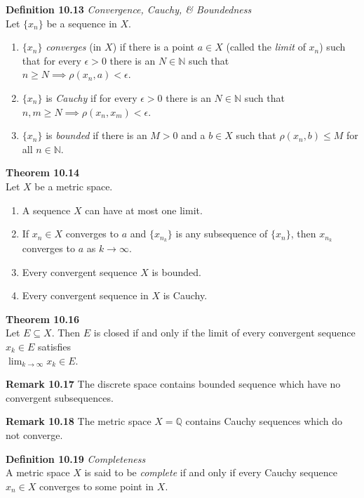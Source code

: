 \documentclass[8pt,landscape]{article}
\begin{document}
\begin{multicols}{3}
\textbf{Definition 10.13} \emph{Convergence, Cauchy, \& Boundedness} \\
Let $\{x_n\}$ be a sequence in $X$.
\begin{enumerate}
    \item $\{x_n\}$ \emph{converges} (in $X$) if there is a point $a \in X$
        (called the \emph{limit} of $x_n$) such that for every $\epsilon > 0$
        there is an $N \in \mathbb{N}$ such that \\
        $n \geq N \implies \rho(x_n, a) < \epsilon$.
    \item $\{x_n\}$ is \emph{Cauchy} if for every $\epsilon > 0$ there is an
        $N \in \mathbb{N}$ such that \\
        $n, m \geq N \implies \rho(x_n, x_m) < \epsilon$.
    \item $\{x_n\}$ is \emph{bounded} if there is an $M > 0$ and a $b \in X$ such that
        $\rho (x_n, b) \leq M$ for all $n \in \mathbb{N}$.
\end{enumerate}

\textbf{Theorem 10.14} \\
Let $X$ be a metric space.
\begin{enumerate}
    \item A sequence $X$ can have at most one limit.
    \item If $x_n \in X$ converges to $a$ and $\{x_{n_k}\}$ is any subsequence of
        $\{x_n\}$, then $x_{n_k}$ converges to $a$ as $k \to \infty$.
    \item Every convergent sequence $X$ is bounded.
    \item Every convergent sequence in $X$ is Cauchy.
\end{enumerate}

\textbf{Theorem 10.16} \\
Let $E \subseteq X$.
Then $E$ is closed if and only if the limit of every convergent sequence $x_k \in E$
satisfies \\
$\lim_{k \to \infty} x_k \in E$.

\textbf{Remark 10.17}
The discrete space contains bounded sequence which have no convergent subsequences.

\textbf{Remark 10.18}
The metric space $X = \mathbb{Q}$ contains Cauchy sequences which do not converge.

\textbf{Definition 10.19} \emph{Completeness} \\
A metric space $X$ is said to be \emph{complete} if and only if every Cauchy sequence
$x_n \in X$ converges to some point in $X$.


\end{multicols}
\end{document}
